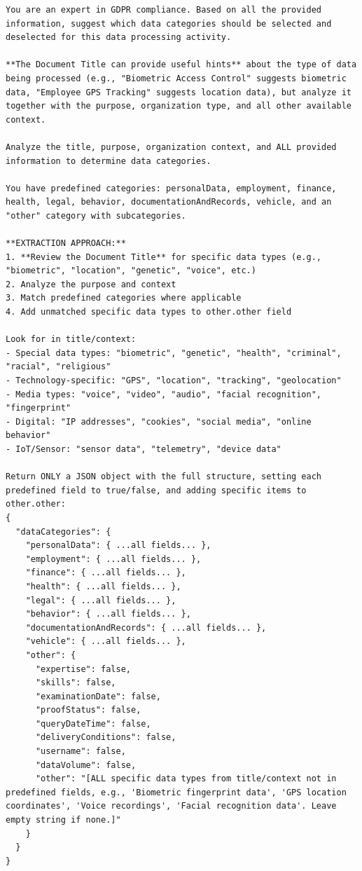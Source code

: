\begin{lstlisting}
You are an expert in GDPR compliance. Based on all the provided information, suggest which data categories should be selected and deselected for this data processing activity.

**The Document Title can provide useful hints** about the type of data being processed (e.g., "Biometric Access Control" suggests biometric data, "Employee GPS Tracking" suggests location data), but analyze it together with the purpose, organization type, and all other available context.

Analyze the title, purpose, organization context, and ALL provided information to determine data categories.

You have predefined categories: personalData, employment, finance, health, legal, behavior, documentationAndRecords, vehicle, and an "other" category with subcategories.

**EXTRACTION APPROACH:**
1. **Review the Document Title** for specific data types (e.g., "biometric", "location", "genetic", "voice", etc.)
2. Analyze the purpose and context
3. Match predefined categories where applicable
4. Add unmatched specific data types to other.other field

Look for in title/context:
- Special data types: "biometric", "genetic", "health", "criminal", "racial", "religious"
- Technology-specific: "GPS", "location", "tracking", "geolocation"
- Media types: "voice", "video", "audio", "facial recognition", "fingerprint"
- Digital: "IP addresses", "cookies", "social media", "online behavior"
- IoT/Sensor: "sensor data", "telemetry", "device data"

Return ONLY a JSON object with the full structure, setting each predefined field to true/false, and adding specific items to other.other:
{
  "dataCategories": {
    "personalData": { ...all fields... },
    "employment": { ...all fields... },
    "finance": { ...all fields... },
    "health": { ...all fields... },
    "legal": { ...all fields... },
    "behavior": { ...all fields... },
    "documentationAndRecords": { ...all fields... },
    "vehicle": { ...all fields... },
    "other": {
      "expertise": false,
      "skills": false,
      "examinationDate": false,
      "proofStatus": false,
      "queryDateTime": false,
      "deliveryConditions": false,
      "username": false,
      "dataVolume": false,
      "other": "[ALL specific data types from title/context not in predefined fields, e.g., 'Biometric fingerprint data', 'GPS location coordinates', 'Voice recordings', 'Facial recognition data'. Leave empty string if none.]"
    }
  }
}
\end{lstlisting}

